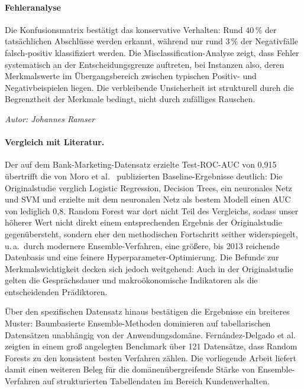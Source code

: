 \documentclass[10pt]{scrartcl}
\begin{document}
\paragraph{Fehleranalyse}

Die Konfusionsmatrix bestätigt das konservative Verhalten: Rund 40\,\% der tatsächlichen Abschlüsse werden erkannt, während nur rund 3\,\% der Negativfälle falsch-positiv klassifiziert werden. Die Misclassification-Analyse zeigt, dass Fehler systematisch an der Entscheidungsgrenze auftreten, bei Instanzen also, deren Merkmalswerte im Übergangsbereich zwischen typischen Positiv- und Negativbeispielen liegen. Die verbleibende Unsicherheit ist strukturell durch die Begrenztheit der Merkmale bedingt, nicht durch zufälliges Rauschen.

\begin{flushright}\textit{Autor: Johannes Ramser}\end{flushright}

\paragraph{Vergleich mit Literatur.}

Der auf dem Bank-Marketing-Datensatz erzielte Test-ROC-AUC von 0{,}915 übertrifft die von Moro et al.~\cite{Moro2014} publizierten Baseline-Ergebnisse deutlich: Die Originalstudie verglich Logistic Regression, Decision Trees, ein neuronales Netz und SVM und erzielte mit dem neuronalen Netz als bestem Modell einen AUC von lediglich 0{,}8. Random Forest war dort nicht Teil des Vergleichs, sodass unser höherer Wert nicht direkt einem entsprechenden Ergebnis der Originalstudie gegenübersteht, sondern eher den methodischen Fortschritt seither widerspiegelt, u.\,a.\ durch modernere Ensemble-Verfahren, eine größere, bis 2013 reichende Datenbasis und eine feinere Hyperparameter-Optimierung. Die Befunde zur Merkmalswichtigkeit decken sich jedoch weitgehend: Auch in der Originalstudie gelten die Gesprächsdauer und makroökonomische Indikatoren als die entscheidenden Prädiktoren.

Über den spezifischen Datensatz hinaus bestätigen die Ergebnisse ein breiteres Muster: Baumbasierte Ensemble-Methoden dominieren auf tabellarischen Datensätzen unabhängig von der Anwendungsdomäne. Fernández-Delgado et al.~\cite{FernandezDelgado2014} zeigten in einem groß angelegten Benchmark über 121 Datensätze, dass Random Forests zu den konsistent besten Verfahren zählen. Die vorliegende Arbeit liefert damit einen weiteren Beleg für die domänenübergreifende Stärke von Ensemble-Verfahren auf strukturierten Tabellendaten im Bereich Kundenverhalten.
\end{document}
